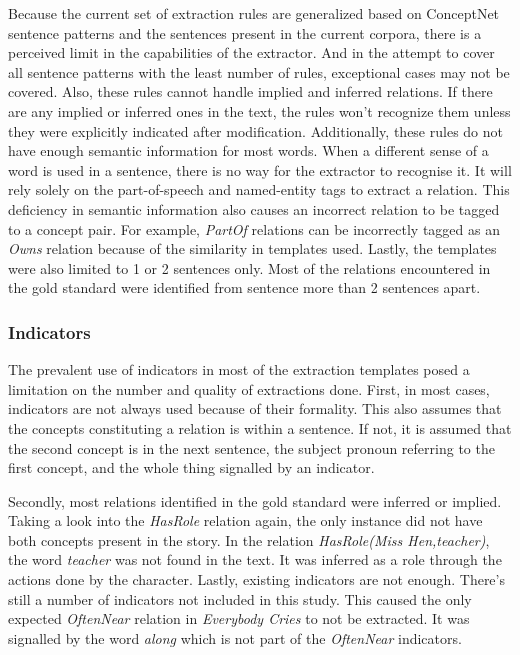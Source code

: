 Because the current set of extraction rules are generalized based on ConceptNet sentence patterns and the sentences present in the current corpora, there is a perceived limit in the capabilities of the extractor. And in the attempt to cover all sentence patterns with the least number of rules, exceptional cases may not be covered. Also, these rules cannot handle implied and inferred relations. If there are any implied or inferred ones in the text, the rules won't recognize them unless they were explicitly indicated after modification. Additionally, these rules do not have enough semantic information for most words. When a different sense of a word is used in a sentence, there is no way for the extractor to recognise it. It will rely solely on the part-of-speech and named-entity tags to extract a relation. This deficiency in semantic information also causes an incorrect relation to be tagged to a concept pair. For example, \textit{PartOf} relations can be incorrectly tagged as an \textit{Owns} relation because of the similarity in templates used.  Lastly, the templates were also limited to 1 or 2 sentences only. Most of the relations encountered in the gold standard were identified from sentence more than 2 sentences apart. 

\subsubsection{Indicators}
\label{sec:indicators}

The prevalent use of indicators in most of the extraction templates posed a limitation on the number and quality of extractions done. First, in most cases, indicators are not always used because of their formality. This also assumes that the concepts constituting a relation is within a sentence. If not, it is assumed that the second concept is in the next sentence, the subject pronoun referring to the first concept, and the whole thing signalled by an indicator.

Secondly, most relations identified in the gold standard were inferred or implied. Taking a look into the \textit{HasRole} relation again, the only instance did not have both concepts present in the story. In the relation \textit{HasRole(Miss Hen,teacher)}, the word \textit{teacher} was not found in the text. It was inferred as a role through the actions done by the character. Lastly, existing indicators are not enough. There's still a number of indicators not included in this study. This caused the only expected \textit{OftenNear} relation in \textit{Everybody Cries} to not be extracted. It was signalled by the word \textit{along} which is not part of the \textit{OftenNear} indicators.

